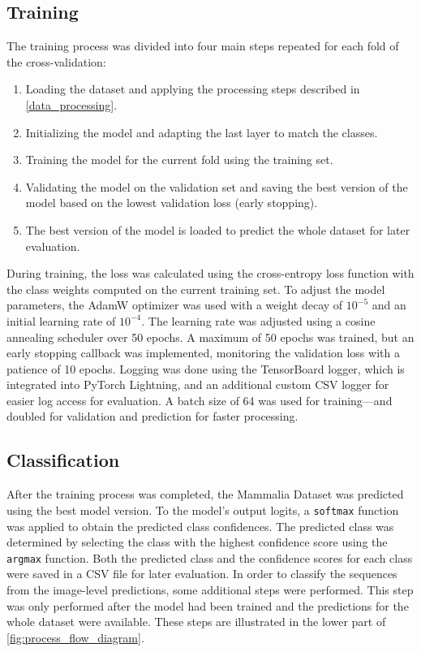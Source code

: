     \subsection{Training}
    The training process was divided into four main steps repeated for each fold of the cross-validation:
    \begin{enumerate}
        \item Loading the dataset and applying the processing steps described in \autoref{data_processing}.
        \item Initializing the model and adapting the last layer to match the classes.
        \item Training the model for the current fold using the training set.
        \item Validating the model on the validation set and saving the best version of the model based on the lowest validation loss (early stopping).
        \item The best version of the model is loaded to predict the whole dataset for later evaluation.
    \end{enumerate}

    During training, the loss was calculated using the cross-entropy loss function with the class weights computed on the current training set.
    To adjust the model parameters, the AdamW optimizer \autocite{loshchilovDecoupledWeightDecay2019} was used with a weight decay of \(10^{-5}\) and an initial learning rate of \(10^{-4}\).
    The learning rate was adjusted using a cosine annealing scheduler \autocite{loshchilovSGDRStochasticGradient2017} over 50 epochs.
    A maximum of 50 epochs was trained, but an early stopping callback was implemented, monitoring the validation loss with a patience of 10 epochs.
    Logging was done using the TensorBoard logger, which is integrated into PyTorch Lightning, and an additional custom \ac{CSV} logger for easier log access for evaluation.
    A batch size of 64 was used for training---and doubled for validation and prediction for faster processing.

    \subsection{Classification}
    After the training process was completed, the Mammalia Dataset was predicted using the best model version.
    To the model's output logits, a \texttt{softmax} function was applied to obtain the predicted class confidences.
    The predicted class was determined by selecting the class with the highest confidence score using the \texttt{argmax} function.
    Both the predicted class and the confidence scores for each class were saved in a \ac{CSV} file for later evaluation.
    In order to classify the sequences from the image-level predictions, some additional steps were performed.
    This step was only performed after the model had been trained and the predictions for the whole dataset were available.
    These steps are illustrated in the lower part of \autoref{fig:process_flow_diagram}.

